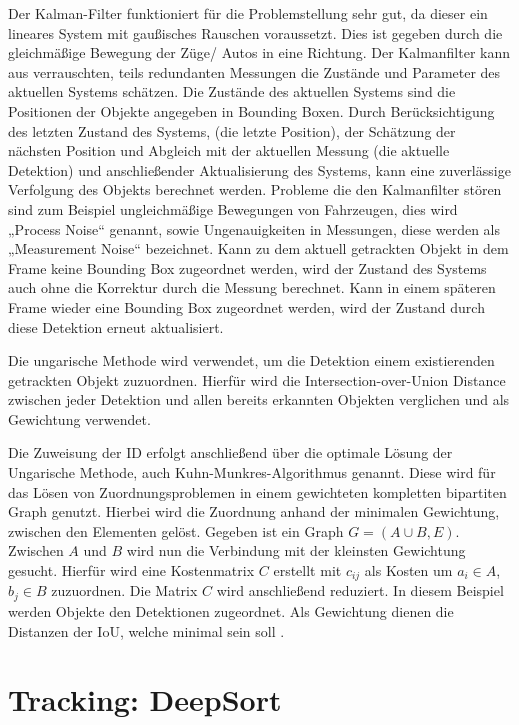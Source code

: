 \documentclass[conference]{IEEEtran}
\begin{document}
	Der Kalman-Filter funktioniert für die Problemstellung sehr gut, da dieser ein lineares System mit gaußisches Rauschen voraussetzt. Dies ist gegeben durch die gleichmäßige Bewegung der Züge/ Autos in eine Richtung.
	Der Kalmanfilter kann aus verrauschten, teils redundanten Messungen die Zustände und Parameter des aktuellen Systems schätzen. 
	Die Zustände des aktuellen Systems sind die Positionen der Objekte angegeben in Bounding Boxen. Durch Berücksichtigung des letzten Zustand des Systems, (die letzte Position), der Schätzung der nächsten Position und Abgleich mit der aktuellen Messung (die aktuelle Detektion) und anschließender Aktualisierung des Systems, kann eine zuverlässige Verfolgung des Objekts berechnet werden. Probleme die den Kalmanfilter stören sind zum Beispiel ungleichmäßige Bewegungen von Fahrzeugen, dies wird „Process Noise“ genannt, sowie Ungenauigkeiten in Messungen, diese werden als „Measurement Noise“ bezeichnet.
	Kann zu dem aktuell getrackten Objekt in dem Frame keine Bounding Box zugeordnet werden, wird der Zustand des Systems auch ohne die Korrektur durch die Messung berechnet. Kann in einem späteren Frame wieder eine Bounding Box zugeordnet werden, wird der Zustand durch diese Detektion erneut aktualisiert.
	
	Die ungarische Methode wird verwendet, um die Detektion einem existierenden getrackten Objekt zuzuordnen. Hierfür wird die Intersection-over-Union Distance zwischen jeder Detektion und allen bereits erkannten Objekten verglichen und als Gewichtung verwendet.
	
	Die Zuweisung der ID erfolgt anschließend über die optimale Lösung der Ungarische Methode, auch Kuhn-Munkres-Algorithmus genannt. Diese wird für das Lösen von Zuordnungsproblemen in einem gewichteten kompletten bipartiten Graph genutzt. Hierbei wird die Zuordnung anhand der minimalen Gewichtung, zwischen den Elementen gelöst. Gegeben ist ein Graph $G = (A \cup B, E) $. Zwischen $A$ und $B$ wird nun die Verbindung mit der kleinsten Gewichtung gesucht. Hierfür wird eine Kostenmatrix $C$ erstellt mit $c_{ij}$ als Kosten um $a_i \in A$, $b_j \in B$ zuzuordnen. Die Matrix $C$ wird anschließend reduziert. In diesem Beispiel werden Objekte den Detektionen zugeordnet. Als Gewichtung dienen die Distanzen der IoU, welche minimal sein soll \cite{hungarian}.
	 
	\section{Tracking: DeepSort}
	
\end{document}

